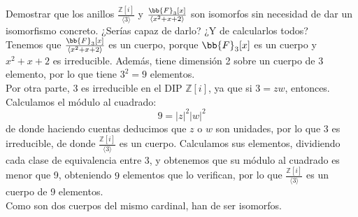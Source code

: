 \begin{ejercicio}
    Demostrar que los anillos $\frac{\mathbb{Z}[i]}{\langle 3 \rangle }$ y $\frac{\bb{F}_3[x]}{\langle x^2+x+2 \rangle }$ son isomorfos sin necesidad de dar un isomorfismo concreto. ¿Serías capaz de darlo? ¿Y de calcularlos todos?\\

    \noindent
    Tenemos que $\frac{\bb{F}_3[x]}{\langle x^2+x+2 \rangle }$ es un cuerpo, porque $\bb{F}_3[x]$ es un cuerpo y $x^2+x+2$ es irreducible. Además, tiene dimensión 2 sobre un cuerpo de 3 elemento, por lo que tiene $3^2 = 9$ elementos.\\

    \noindent
    Por otra parte, $3$ es irreducible en el DIP $\mathbb{Z}[i]$, ya que si $3 = zw$, entonces. Calculamos el módulo al cuadrado:
    \begin{equation*}
        9 = |z|^2 |w|^2 
    \end{equation*}
    de donde haciendo cuentas deducimos que $z$ o $w$ son unidades, por lo que $3$ es irreducible, de donde $\frac{\mathbb{Z}[i]}{\langle 3 \rangle }$ es un cuerpo. Calculamos sus elementos, dividiendo cada clase de equivalencia entre 3, y obtenemos que su módulo al cuadrado es menor que 9, obteniendo $9$ elementos que lo verifican, por lo que $\frac{\mathbb{Z}[i]}{\langle 3 \rangle }$ es un cuerpo de 9 elementos.\\

    \noindent
    Como son dos cuerpos del mismo cardinal, han de ser isomorfos.

\end{ejercicio}

